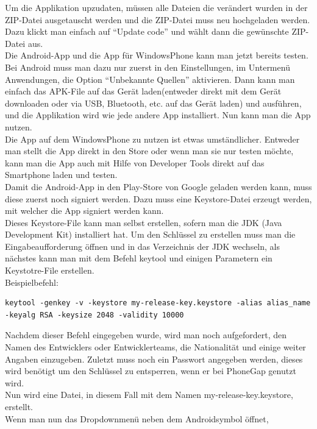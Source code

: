 Um die Applikation upzudaten, müssen alle Dateien die verändert wurden in der ZIP-Datei ausgetauscht werden und die ZIP-Datei muss neu hochgeladen werden. Dazu klickt man einfach auf \enquote{Update code} und wählt dann die gewünschte ZIP-Datei aus.\\
Die Android-App und die App für WindowsPhone kann man jetzt bereits testen. Bei Android muss man dazu nur zuerst in den Einstellungen, im Untermenü Anwendungen, die Option \enquote{Unbekannte Quellen} aktivieren. Dann kann man einfach das APK-File auf das Gerät laden(entweder direkt mit dem Gerät downloaden oder via USB, Bluetooth, etc. auf das Gerät laden) und ausführen, und die Applikation wird wie jede andere App installiert. Nun kann man die App nutzen.\\
Die App auf dem WindowsPhone zu nutzen ist etwas umständlicher. Entweder man stellt die App direkt in den Store oder wenn man sie nur testen möchte, kann man die App auch mit Hilfe von Developer Tools direkt auf das Smartphone laden und testen.\\
Damit die Android-App in den Play-Store von Google geladen werden kann, muss diese zuerst noch signiert werden. Dazu muss eine Keystore-Datei erzeugt werden, mit welcher die App signiert werden kann.\\
Dieses Keystore-File kann man selbst erstellen, sofern man die JDK (Java Development Kit) installiert hat. Um den Schlüssel zu erstellen muss man die Eingabeaufforderung öffnen und in das Verzeichnis der JDK wechseln, als nächstes kann man mit dem Befehl keytool und einigen Parametern ein Keystotre-File erstellen.\\
Beispielbefehl:\\

\begin{lstlisting}
keytool -genkey -v -keystore my-release-key.keystore -alias alias_name -keyalg RSA -keysize 2048 -validity 10000
\end{lstlisting}

Nachdem dieser Befehl eingegeben wurde, wird man noch aufgefordert, den Namen des Entwicklers oder Entwicklerteams, die Nationalität und einige weiter Angaben einzugeben. Zuletzt muss noch ein Passwort angegeben werden, dieses wird benötigt um den Schlüssel zu entsperren, wenn er bei PhoneGap genutzt wird.\\
Nun wird eine Datei, in diesem Fall mit dem Namen my-release-key.keystore, erstellt.\\
Wenn man nun das Dropdownmenü neben dem Androidsymbol öffnet,\\

